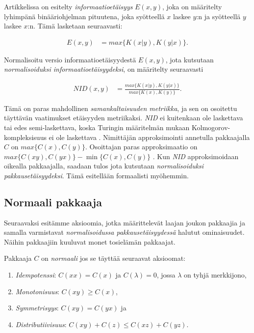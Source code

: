 \documentclass[12pt,finnish]{tktltiki2}
\theoremstyle{definition}
\theoremstyle{remark}
\newcommand{\kolmogorov}{Kolmogorov-kompleksisuus}
\begin{document}
  Artikkelissa \cite{CV05} on esitelty \emph{informaatioetäisyys} $E(x,y)$, joka on määritelty lyhimpänä binääriohjelman pituutena, joka syötteellä $x$ laskee $y$:n ja syötteellä $y$ laskee $x$:n. Tämä lasketaan seuraavasti:

  \begin{align}
    E(x,y) &= max\{K(x|y),K(y|x)\}.
  \end{align}

  Normalisoitu versio informaatioetäisyydestä $E(x,y)$, jota kutsutaan \emph{normalisoiduksi informaatioetäisyydeksi}, on määritelty seuraavasti

  \begin{align}
    NID(x,y) &= \frac{ max\{K{(x|y)},K{(y|x)}\} }{ max \{K(x),K(y)\}}.
  \end{align}

  Tämä on paras mahdollinen \emph{samankaltaisuuden metriikka}, ja sen on osoitettu \cite{CV05} täyttävän vaatimukset etäisyyden metriikaksi.
  \emph{NID} ei kuitenkaan ole laskettava tai edes semi-laskettava, koska Turingin määritelmän mukaan \kolmogorov{} ei ole laskettava \cite{CV05}.
  Nimittäjän approksimointi annetulla pakkaajalla $C$ on $max \{C(x),C(y)\}$.
  Osoittajan paras approksimaatio on $max\{C(xy),C(yx)\} - \min\{C(x),C(y)\}$ \cite{CV05}.
  Kun \emph{NID} approksimoidaan oikealla pakkaajalla, saadaan tulos jota kutsutaan \emph{normalisoiduksi pakkausetäisyydeksi}.
  Tämä esitellään formaalisti myöhemmin.

\subsection{Normaali pakkaaja} %
\label{sub:normaali_pakkaaja}

  Seuraavaksi esitämme aksioomia, jotka määrittelevät laajan joukon pakkaajia ja samalla varmistavat \emph{normalisoidussa pakkausetäisyydessä} halutut ominaisuudet.
  Näihin pakkaajiin kuuluvat monet tosielämän pakkaajat.

  Pakkaaja $C$ on \emph{normaali} jos se täyttää seuraavat aksioomat:

  \label{idempotency}
  \begin{enumerate}
    \item \emph{Idempotenssi}: $C(xx) = C(x)$ ja $C(\lambda) = 0$, jossa $\lambda$ on tyhjä merkkijono,
    \item \emph{Monotonisuus}: $C(xy) \geq C(x)$,
    \item \emph{Symmetrisyys}: $C(xy) = C(yx)$ ja
    \item \emph{Distributiivisuus}: $C(xy) + C(z) \leq C(xz) + C(yz)$.
  \end{enumerate}
\end{document}
